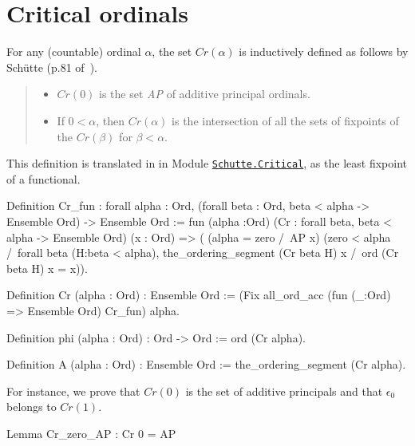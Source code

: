 \documentclass[a4paper]{book}
\begin{document}
{\section{Critical ordinals}


For any  (countable) ordinal $\alpha$, the set $\textit{Cr}(\alpha)$ is inductively defined 
as follows by Schütte (p.81 of~\cite{schutte}).

\begin{quote}
  \begin{itemize}
  \item $\textit{Cr}(0)$ is the set \textit{AP} of additive principal ordinals.
  \item If $0<\alpha$, then $\textit{Cr}(\alpha)$ is the intersection of all the sets of fixpoints of the $\textit{Cr}(\beta)$ for $\beta<\alpha$.
  \end{itemize}
\end{quote}

This definition is translated in \coq{} in 
Module \href{../src/html/hydras.Schutte.Critical.html}%
{\texttt{Schutte.Critical}}, as the least fixpoint of a functional. 


\begin{Coqsrc}
Definition Cr_fun : forall alpha : Ord,
       (forall beta : Ord, beta < alpha -> Ensemble Ord) ->
        Ensemble Ord 
:= 
   fun (alpha :Ord)
        (Cr : forall beta, 
                beta < alpha -> Ensemble Ord) 
        (x : Ord) => (
       (alpha = zero /\ AP x) \/
       (zero < alpha /\
        forall beta (H:beta < alpha),
          the_ordering_segment (Cr beta H) x /\ ord (Cr  beta H) x = x)).

Definition Cr (alpha : Ord) : Ensemble Ord := 
    (Fix  all_ord_acc (fun (_:Ord) => Ensemble Ord) Cr_fun) alpha.
\end{Coqsrc}


\begin{Coqsrc}
Definition phi (alpha : Ord) : Ord -> Ord 
    :=  ord (Cr alpha).

Definition A (alpha : Ord) : Ensemble Ord :=
  the_ordering_segment (Cr alpha).
\end{Coqsrc}

For instance,  we prove that $\textit{Cr}(0)$ is the set of additive principals and that $\epsilon_0$
belongs to $\textit{Cr}(1)$.

\begin{Coqsrc}
Lemma Cr_zero_AP :  Cr 0 = AP


\end{Coqsrc}}
\end{document}
